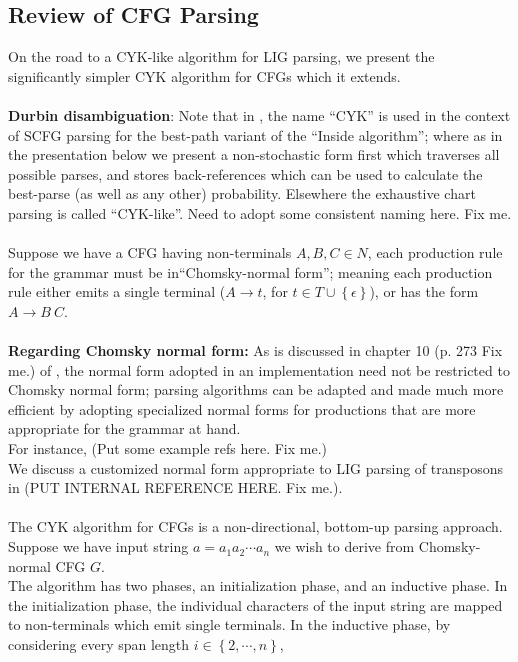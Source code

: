 \documentclass[11pt]{article}
\begin{document}
\subsection {Review of CFG Parsing}
On the road to a CYK-like algorithm for LIG parsing, we present the significantly simpler CYK algorithm
for CFGs which it extends. \\ \\
{\bf Durbin disambiguation}: Note that in \cite{Durbin1998}, the name ``CYK'' is used in the context of
SCFG parsing for the best-path variant of the ``Inside algorithm''; where as in the presentation below
we present a non-stochastic form first which traverses all possible parses, and stores back-references which
can be used to calculate the best-parse (as well as any other) probability. Elsewhere the exhaustive chart parsing
is called ``CYK-like''. Need to adopt some consistent naming here. Fix me.\\
\ \\
Suppose we have a CFG having non-terminals $A, B, C \in N$, each production rule for the grammar must be 
in``Chomsky-normal form''; meaning each production rule either emits a single terminal
($A \rightarrow t$, for $t \in T \cup \left \{\epsilon\right\}$), or has the form
$A \rightarrow B \ C$. \\
\ \\
{\bf Regarding Chomsky normal form:}
As is discussed in chapter 10 (p. 273 Fix me.) of \cite{Durbin1998}, the normal form adopted in an
implementation need not be restricted to Chomsky normal form; parsing algorithms can be adapted and made much more efficient
by adopting specialized normal forms for productions that are more appropriate for the grammar at hand.\\
For instance, (Put some example refs here. Fix me.)\\
We discuss a customized normal form appropriate to LIG parsing of transposons in (PUT INTERNAL REFERENCE HERE. Fix me.).\\
\ \\
The CYK algorithm for CFGs is a non-directional, bottom-up parsing approach.\\
Suppose we have input string $a = a_1 a_2\cdots a_n$ we wish to derive from Chomsky-normal CFG $G$.\\
The algorithm has two phases, an initialization phase, and an inductive phase.
In the initialization phase, the individual characters of the input string are mapped to non-terminals which emit single terminals.
In the inductive phase, by considering every span length $i \in \left\{2,\cdots,n\right\}$, 
\end{document}

